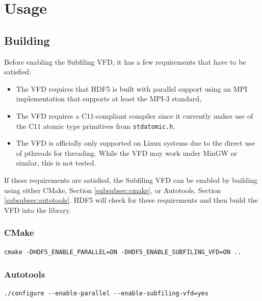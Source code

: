\documentclass[../main.tex]{subfiles}
\begin{document}
\newpage

\section{Usage}

\subsection{Building}

Before enabling the Subfiling VFD, it has a few requirements that have to be
satisfied:

\begin{itemize}
\item The VFD requires that HDF5 is built with parallel support using an MPI
implementation that supports at least the MPI-3 standard,

\item The VFD requires a C11-compliant compiler since it currently makes use
of the C11 atomic type primitives from \texttt{stdatomic.h},

\item The VFD is officially only supported on Linux systems due to
the direct use of pthreads for threading. While the VFD may work under
MinGW or similar, this is not tested.
\end{itemize}

If these requirements are satisfied, the Subfiling VFD can be enabled by building using either CMake, Section \ref{subsubsec:cmake}, or Autotools, Section  \ref{subsubsec:autotools}. HDF5
will check for these requirements and then build the VFD into the library.

\subsubsection{\label{subsubsec:cmake}CMake}

\begin{verbatim}
cmake -DHDF5_ENABLE_PARALLEL=ON -DHDF5_ENABLE_SUBFILING_VFD=ON ..
\end{verbatim}

\subsubsection{\label{subsubsec:autotools}Autotools}

\begin{verbatim}
./configure --enable-parallel --enable-subfiling-vfd=yes
\end{verbatim}
\end{document}
